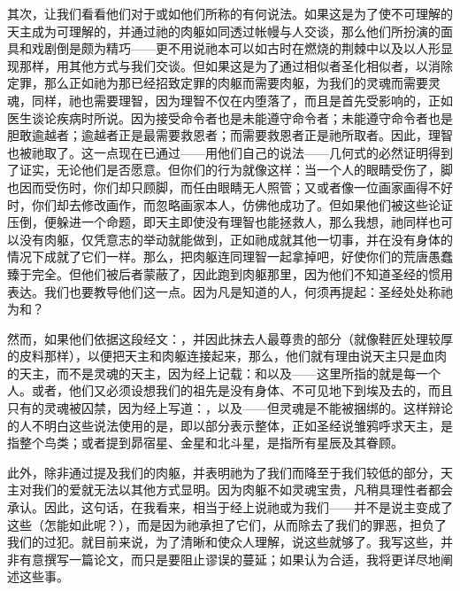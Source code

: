 其次，让我们看看他们对于或如他们所称的有何说法。如果这是为了使不可理解的天主成为可理解的，并通过祂的肉躯如同透过帐幔与人交谈，那么他们所扮演的面具和戏剧倒是颇为精巧——更不用说祂本可以如古时在燃烧的荆棘中以及以人形显现那样，用其他方式与我们交谈。但如果这是为了通过相似者圣化相似者，以消除定罪，那么正如祂为那已经招致定罪的肉躯而需要肉躯，为我们的灵魂而需要灵魂，同样，祂也需要理智，因为理智不仅在内堕落了，而且是首先受影响的，正如医生谈论疾病时所说。因为接受命令者也是未能遵守命令者；未能遵守命令者也是胆敢逾越者；逾越者正是最需要救恩者；而需要救恩者正是祂所取者。因此，理智也被祂取了。这一点现在已通过——用他们自己的说法——几何式的必然证明得到了证实，无论他们是否愿意。但你们的行为就像这样：当一个人的眼睛受伤了，脚也因而受伤时，你们却只顾脚，而任由眼睛无人照管；又或者像一位画家画得不好时，你们却去修改画作，而忽略画家本人，仿佛他成功了。但如果他们被这些论证压倒，便躲进一个命题，即天主即使没有理智也能拯救人，那么我想，祂同样也可以没有肉躯，仅凭意志的举动就能做到，正如祂成就其他一切事，并在没有身体的情况下成就了它们一样。那么，把肉躯连同理智一起拿掉吧，好使你们的荒唐愚蠢臻于完全。但他们被后者蒙蔽了，因此跑到肉躯那里，因为他们不知道圣经的惯用表达。我们也要教导他们这一点。因为凡是知道的人，何须再提起：圣经处处称祂为和？\par

然而，如果他们依据这段经文：，并因此抹去人最尊贵的部分（就像鞋匠处理较厚的皮料那样），以便把天主和肉躯连接起来，那么，他们就有理由说天主只是血肉的天主，而不是灵魂的天主，因为经上记载：和以及——这里所指的就是每一个人。或者，他们又必须设想我们的祖先是没有身体、不可见地下到埃及去的，而且只有的灵魂被囚禁，因为经上写道：，以及——但灵魂是不能被捆绑的。这样辩论的人不明白这些说法使用的是，即以部分表示整体，正如圣经说雏鸦呼求天主，是指整个鸟类；或者提到昴宿星、金星和北斗星，是指所有星辰及其眷顾。\par

此外，除非通过提及我们的肉躯，并表明祂为了我们而降至于我们较低的部分，天主对我们的爱就无法以其他方式显明。因为肉躯不如灵魂宝贵，凡稍具理性者都会承认。因此，这句话，在我看来，相当于经上说祂或为我们——并不是说主变成了这些（怎能如此呢？），而是因为祂承担了它们，从而除去了我们的罪恶，担负了我们的过犯。就目前来说，为了清晰和使众人理解，说这些就够了。我写这些，并非有意撰写一篇论文，而只是要阻止谬误的蔓延；如果认为合适，我将更详尽地阐述这些事。\par


